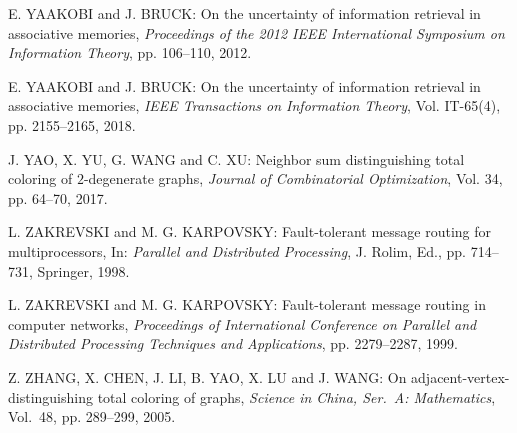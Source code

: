 \begin{thebibliography}{999}
E. YAAKOBI and J. BRUCK: On the uncertainty of information retrieval in associative memories, {\it Proceedings of the 2012 IEEE International Symposium on Information Theory}, pp. 106--110, 2012.

E. YAAKOBI and J. BRUCK: On the uncertainty of information retrieval in associative memories, {\it IEEE Transactions on Information Theory}, Vol. IT-65(4), pp. 2155--2165, 2018.

J. YAO, X. YU, G. WANG and C. XU: Neighbor sum distinguishing total coloring of $2$-degenerate graphs, {\it Journal of Combinatorial Optimization}, Vol. 34, pp. 64--70, 2017.

L. ZAKREVSKI and M. G. KARPOVSKY: Fault-tolerant message routing for multiprocessors, In: {\it Parallel and Distributed Processing}, J. Rolim, Ed., pp. 714--731, Springer, 1998.

L. ZAKREVSKI and M. G. KARPOVSKY: Fault-tolerant message routing in computer networks, {\it Proceedings of International Conference on Parallel and Distributed Processing Techniques and Applications}, pp. 2279--2287, 1999.

Z. ZHANG, X. CHEN, J. LI, B. YAO, X. LU and J. WANG: On adjacent-vertex-distinguishing total coloring of graphs, {\it Science in China, Ser.~A: Mathematics}, Vol.~48, pp. 289--299, 2005.
\end{thebibliography}

